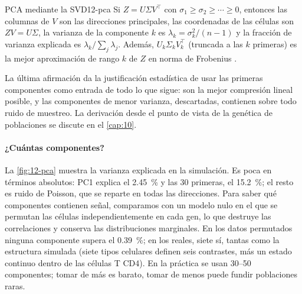 \begin{teorema}{PCA mediante la SVD}{12-pca}
Si $Z = U\Sigma V^{\top}$ con $\sigma_1\ge\sigma_2\ge\cdots\ge0$, entonces las columnas de $V$ son las direcciones principales, las coordenadas de las células son $ZV = U\Sigma$, la varianza de la componente $k$ es $\lambda_k=\sigma_k^2/(n-1)$ y la fracción de varianza explicada es $\lambda_k/\sum_j\lambda_j$. Además, $U_k\Sigma_kV_k^{\top}$ (truncada a las $k$ primeras) es la mejor aproximación de rango $k$ de $Z$ en norma de Frobenius \parencite{c12-hastie2009}.
\end{teorema}

La última afirmación da la justificación estadística de usar las primeras componentes como entrada de todo lo que sigue: son la mejor compresión lineal posible, y las componentes de menor varianza, descartadas, contienen sobre todo ruido de muestreo. La derivación desde el punto de vista de la genética de poblaciones se discute en el \cref{cap:10}.

\paragraph{¿Cuántas componentes?} La \cref{fig:12-pca} muestra la varianza explicada en la simulación. Es poca en términos absolutos: PC1 explica el \SI{2.45}{\percent} y las 30 primeras, el \SI{15.2}{\percent}; el resto es ruido de Poisson, que se reparte en todas las direcciones. Para saber qué componentes contienen señal, comparamos con un modelo nulo en el que se permutan las células independientemente en cada gen, lo que destruye las correlaciones y conserva las distribuciones marginales. En los datos permutados ninguna componente supera el \SI{0.39}{\percent}; en los reales, siete sí, tantas como la estructura simulada (siete tipos celulares definen seis contrastes, más un estado continuo dentro de las células T CD4). En la práctica se usan 30--50 componentes; tomar de más es barato, tomar de menos puede fundir poblaciones raras.

